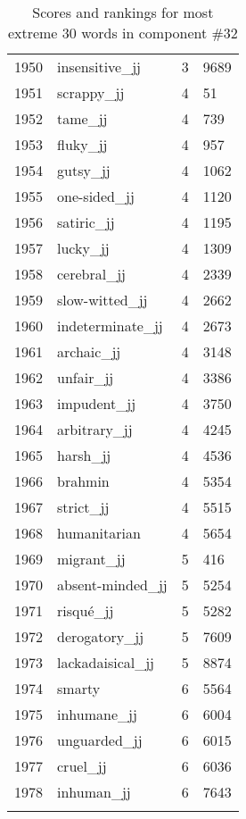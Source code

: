 \begin{longtable}[!htbp]{| rlr@{.}l |}
    1950 & insensitive\_jj & 3 & 9689 \\
    1951 & scrappy\_jj & 4 & 51 \\
    1952 & tame\_jj & 4 & 739 \\
    1953 & fluky\_jj & 4 & 957 \\
    1954 & gutsy\_jj & 4 & 1062 \\
    1955 & one-sided\_jj & 4 & 1120 \\
    1956 & satiric\_jj & 4 & 1195 \\
    1957 & lucky\_jj & 4 & 1309 \\
    1958 & cerebral\_jj & 4 & 2339 \\
    1959 & slow-witted\_jj & 4 & 2662 \\
    1960 & indeterminate\_jj & 4 & 2673 \\
    1961 & archaic\_jj & 4 & 3148 \\
    1962 & unfair\_jj & 4 & 3386 \\
    1963 & impudent\_jj & 4 & 3750 \\
    1964 & arbitrary\_jj & 4 & 4245 \\
    1965 & harsh\_jj & 4 & 4536 \\
    1966 & brahmin & 4 & 5354 \\
    1967 & strict\_jj & 4 & 5515 \\
    1968 & humanitarian & 4 & 5654 \\
    1969 & migrant\_jj & 5 & 416 \\
    1970 & absent-minded\_jj & 5 & 5254 \\
    1971 & risqué\_jj & 5 & 5282 \\
    1972 & derogatory\_jj & 5 & 7609 \\
    1973 & lackadaisical\_jj & 5 & 8874 \\
    1974 & smarty & 6 & 5564 \\
    1975 & inhumane\_jj & 6 & 6004 \\
    1976 & unguarded\_jj & 6 & 6015 \\
    1977 & cruel\_jj & 6 & 6036 \\
    1978 & inhuman\_jj & 6 & 7643 \\
    \hline
    \caption{Scores and rankings for most extreme 30 words in component \#32} \\
\end{longtable}
